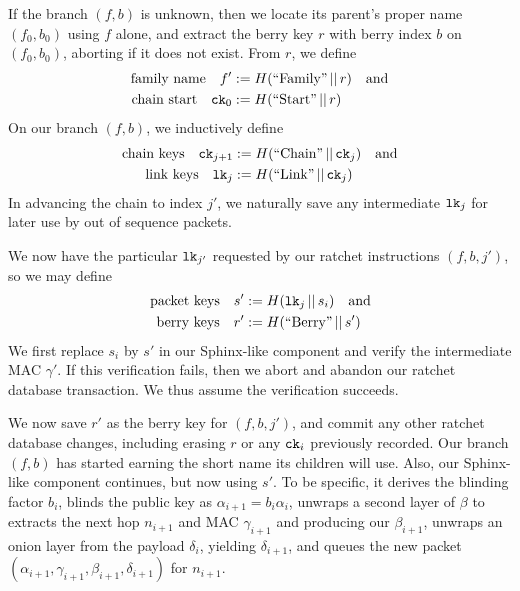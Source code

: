 \documentclass[twoside,letterpaper]{llncs}
\def\mathperiod{.}
\def\mathcomma{}
\def\mathperiod{}
\begin{document}
If the branch $(f,b)$ is unknown, then we locate its parent's
proper name $(f_0,b_0)$ using $f$ alone, and extract the berry
key $r$ with berry index $b$ on $(f_0,b_0)$,
 aborting if it does not exist.
From $r$, we define
\[ \begin{aligned}
\textrm{family name}\quad
 f' &:= H(\textrm{``Family''} \,||\, r) \quad\textrm{and} \\ %
\textrm{chain start}\quad
 \ck_0 &:= H(\textrm{``Start''} \,||\, r) \mathperiod \\
\end{aligned} \]
On our branch $(f,b)$, we inductively define 
\[ \begin{aligned}
\textrm{chain keys}\quad
 \ck_{j+1} &:= H(\textrm{``Chain''} \,||\, \ck_j) \quad\textrm{and} \\ %
\textrm{link keys}\quad
 \lk_j &:= H(\textrm{``Link''} \,||\, \ck_j) \mathperiod \\
\end{aligned} \]
In advancing the chain to index $j'$, we naturally save any 
intermediate $\texttt{lk}_j$ for later use by out of sequence packets.

We now have the particular $\texttt{lk}_{j'}$ requested by our ratchet 
instructions $(f,b,j')$, so we may define 
\[ \begin{aligned}
\textrm{packet keys}\quad 
 s' &:= H(\lk_j \,||\, s_i) \quad\textrm{and} \\ %
\textrm{berry keys}\quad 
 r' &:= H(\textrm{``Berry''} \,||\, s') \mathperiod \\
\end{aligned} \]
We first replace $s_i$ by $s'$ in our Sphinx-like component
and verify the intermediate MAC $\gamma'$.  If this verification
fails, then we abort and abandon our ratchet database transaction.
We thus assume the verification succeeds.  

We now save $r'$ as the berry key for $(f,b,j')$, and commit any
other ratchet database changes, including erasing $r$ or any 
$\texttt{ck}_i$ previously recorded.  Our branch $(f,b)$ has started
earning the short name its children will use.  
Also, our Sphinx-like component continues, but now using $s'$.
To be specific, it derives the blinding factor $b_i$,
blinds the public key as $\alpha_{i+1} = b_i \alpha_i$,
unwraps a second layer of $\beta$ to extracts the
 next hop $n_{i+1}$ and MAC $\gamma_{i+1}$ and 
 producing our $\beta_{i+1}$,
unwraps an onion layer from the payload $\delta_i$,
 yielding $\delta_{i+1}$, and queues the new packet
$(\alpha_{i+1},\gamma_{i+1},\beta_{i+1},\delta_{i+1})$ for $n_{i+1}$.
\end{document}
